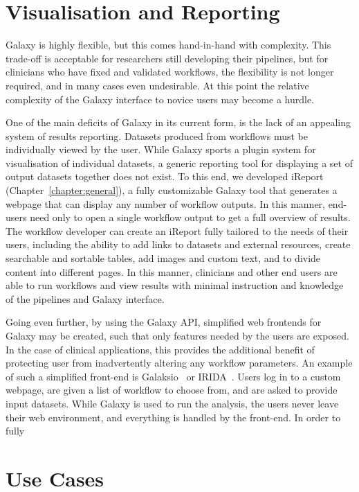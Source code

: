 \section{Visualisation and Reporting}

Galaxy is highly flexible, but this comes hand-in-hand with complexity. This trade-off is acceptable for researchers still developing their pipelines, but for clinicians who have fixed and validated workflows, the flexibility is not longer required, and in many cases even undesirable. At this point the relative complexity of the Galaxy interface to novice users may become a hurdle.

One of the main deficits of Galaxy in its current form, is the lack of an appealing system of results reporting. Datasets produced from workflows must be individually viewed by the user. While Galaxy sports a plugin system for visualisation of individual datasets, a generic reporting tool for displaying a set of output datasets together does not exist. To this end, we developed iReport (Chapter~\ref{chapter:general}), a fully customizable Galaxy tool that generates a webpage that can display any number of workflow outputs. In this manner, end-users need only to open a single workflow output to get a full overview of results. The workflow developer can create an iReport fully tailored to the needs of their users, including the ability to add links to datasets and external resources, create searchable and sortable tables, add images and custom text, and to divide content into different pages. In this manner, clinicians and other end users are able to run workflows and view results with minimal instruction and knowledge of the pipelines and Galaxy interface.

Going even further, by using the Galaxy API, simplified web frontends for Galaxy may be created, such that only features needed by the users are exposed. In the case of clinical applications, this provides the additional benefit of protecting user from inadvertently altering any workflow parameters. An example of such a simplified front-end is Galaksio~\cite{galaksio} or IRIDA~\cite{}. Users log in to a custom webpage, are given a list of workflow to choose from, and are asked to provide input datasets. While Galaxy is used to run the analysis, the users never leave their web environment, and everything is handled by the front-end. In order to fully


\section{Use Cases}

